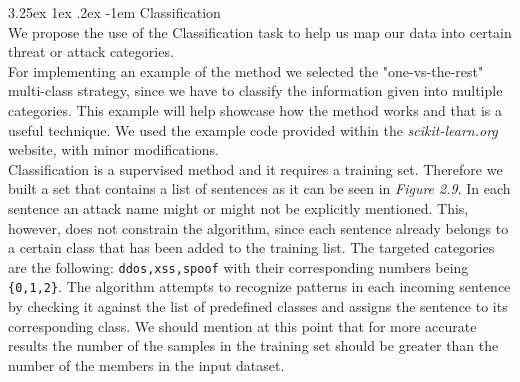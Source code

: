 \documentclass[12pt]{article}
\makeatletter
\renewcommand\paragraph{\@startsection{paragraph}{5}{\z@}%
  {3.25ex \@plus1ex \@minus.2ex}%
  {-1em}%
  {\normalfont\normalsize\bfseries}}
\makeatother
\begin{document}
\paragraph{Classification}
\hfill \break
\\
We propose the use of the Classification task to help us map our data into certain threat or attack categories. 
\hfill \break
\\
For implementing an example of the method we selected the "one-vs-the-rest" multi-class strategy\cite{classiciation-multilabel}, since we have to classify the information given into multiple categories. This example will help showcase how the method works and that is a useful technique. We used the example code \cite{learn-classification} provided within the \textit{scikit-learn.org} website, with minor modifications.
\hfill \break
\\
Classification is a supervised method and it requires a training set. Therefore we built a set that contains a list of sentences as it can be seen in \textit{Figure 2.9}. In each sentence an attack name might or might not be explicitly mentioned. This, however, does not constrain the algorithm, since each sentence already belongs to a certain class that has been added to the training list. The targeted categories are the following: \texttt{ddos,xss,spoof} with their corresponding numbers being  \texttt{\{0,1,2\}}. The algorithm attempts to recognize patterns in each incoming sentence by checking it against the list of predefined classes and assigns the sentence to its corresponding class. We should mention at this point that for more accurate results the number of the samples in the training set should be greater than the number of the members in the input dataset.
\end{document}
